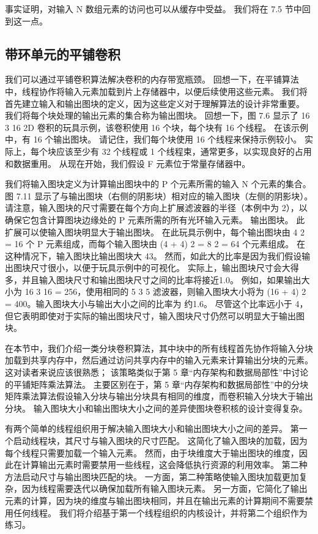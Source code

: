 事实证明，对输入 N 数组元素的访问也可以从缓存中受益。 我们将在 7.5 节中回到这一点。

\subsection{带环单元的平铺卷积}
我们可以通过平铺卷积算法解决卷积的内存带宽瓶颈。 回想一下，在平铺算法中，线程协作将输入元素加载到片上存储器中，以便后续使用这些元素。 我们将首先建立输入和输出图块的定义，因为这些定义对于理解算法的设计非常重要。 我们将每个块处理的输出元素的集合称为输出图块。 回想一下，图 7.6 显示了 16 3 16 2D 卷积的玩具示例，该卷积使用 16 个块，每个块有 16 个线程。 在该示例中，有 16 个输出图块。 请记住，我们每个块使用 16 个线程来保持示例较小。 实际上，每个块应该至少有 32 个线程或 1 个线程束，通常更多，以实现良好的占用和数据重用。 从现在开始，我们假设 F 元素位于常量存储器中。

我们将输入图块定义为计算输出图块中的 P 个元素所需的输入 N 个元素的集合。 图 7.11 显示了与输出图块（右侧的阴影块）相对应的输入图块（左侧的阴影块）。 请注意，输入图块的尺寸需要在每个方向上扩展滤波器的半径（本例中为 2），以确保它包含计算图块边缘处的 P 元素所需的所有光环输入元素。 输出图块。 此扩展可以使输入图块明显大于输出图块。 在此玩具示例中，每个输出图块由 4 2 = 16 个 P 元素组成，而每个输入图块由 (4 + 4) 2 = 8 2 = 64 个元素组成。 在这种情况下，输入图块比输出图块大 43。 然而，如此大的比率是因为我们假设输出图块尺寸很小，以便于玩具示例中的可视化。 实际上，输出图块尺寸会大得多，并且输入图块尺寸和输出图块尺寸之间的比率将接近1.0。 例如，如果输出大小为 16 3 16 = 256，使用相同的 5 3 5 滤波器，则输入图块大小将为 (16 + 4) 2 = 400。输入图块大小与输出大小之间的比率为 约1.6。 尽管这个比率远小于 4，但它表明即使对于实际的输出图块尺寸，输入图块尺寸仍然可以明显大于输出图块。

在本节中，我们介绍一类分块卷积算法，其中块中的所有线程首先协作将输入分块加载到共享内存中，然后通过访问共享内存中的输入元素来计算输出分块的元素。 这对读者来说应该很熟悉； 该策略类似于第 5 章“内存架构和数据局部性”中讨论的平铺矩阵乘法算法。 主要区别在于，第 5 章“内存架构和数据局部性”中的分块矩阵乘法算法假设输入分块与输出分块具有相同的维度，而卷积输入分块大于输出分块。 输入图块大小和输出图块大小之间的差异使图块卷积核的设计变得复杂。

有两个简单的线程组织用于解决输入图块大小和输出图块大小之间的差异。 第一个启动线程块，其尺寸与输入图块的尺寸匹配。 这简化了输入图块的加载，因为每个线程只需要加载一个输入元素。 然而，由于块维度大于输出图块的维度，因此在计算输出元素时需要禁用一些线程，这会降低执行资源的利用效率。 第二种方法启动尺寸与输出图块匹配的块。 一方面，第二种策略使输入图块加载更加复杂，因为线程需要迭代以确保加载所有输入图块元素。 另一方面，它简化了输出元素的计算，因为块的维度与输出图块相同，并且在输出元素的计算期间不需要禁用任何线程。 我们将介绍基于第一个线程组织的内核设计，并将第二个组织作为练习。

